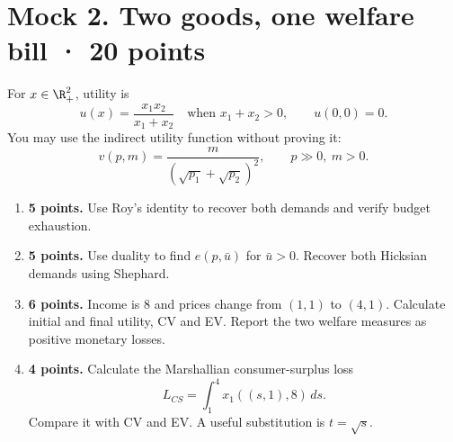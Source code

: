 \section*{Mock 2. Two goods, one welfare bill · 20 points}
For $x\in\R_+^2$, utility is
\[
 u(x)=\frac{x_1x_2}{x_1+x_2}\quad\text{when }x_1+x_2>0,
 \qquad u(0,0)=0.
\]
You may use the indirect utility function without proving it:
\[
 v(p,m)=\frac{m}{(\sqrt{p_1}+\sqrt{p_2})^2},\qquad p\gg0,\ m>0.
\]
\begin{enumerate}[label=(\alph*)]
\item \textbf{5 points.} Use Roy's identity to recover both demands and
verify budget exhaustion.
\item \textbf{5 points.} Use duality to find $e(p,\bar u)$ for $\bar u>0$.
Recover both Hicksian demands using Shephard.
\item \textbf{6 points.} Income is 8 and prices change from $(1,1)$ to
$(4,1)$. Calculate initial and final utility, CV and EV. Report the two
welfare measures as positive monetary losses.
\item \textbf{4 points.} Calculate the Marshallian consumer-surplus loss
\[
 L_{CS}=\int_1^4 x_1((s,1),8)\,ds.
\]
Compare it with CV and EV. A useful substitution is $t=\sqrt s$.
\end{enumerate}
